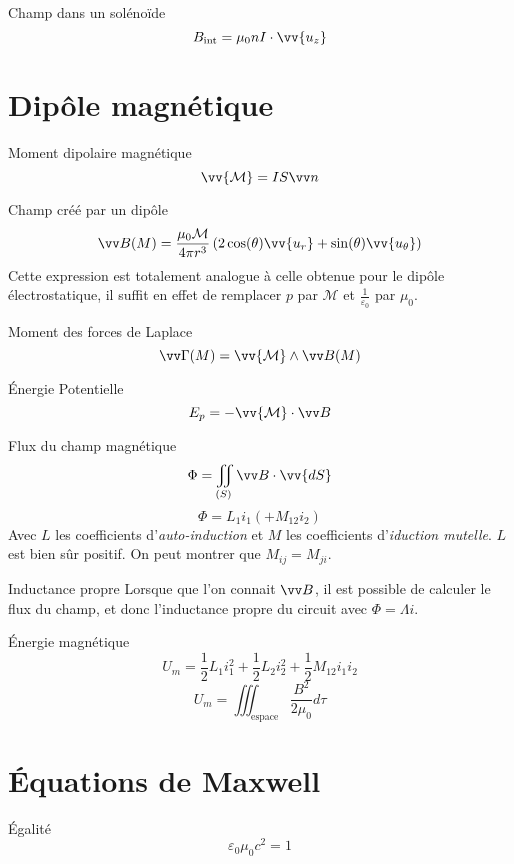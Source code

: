 \documentclass[french, a4paper, 11pt, twocolumn]{article}
\newcommand{\inv}[1]{\dfrac{1}{#1}}
\newcommand{\po}{\left(}         %
\newcommand{\pf}{\right)}        %
\newcommand{\pof}[1]{\po #1 \pf} %
\newcommand{\vect}[1]{\vv{#1}}
\newcommand{\uz}{\vect{u_z}}          %
\newcommand{\ur}{\vect{u_r}}          %
\newcommand{\uth}{\vect{u_\theta}}    %
\begin{document}
\begin{cadre}{Champ dans un solénoïde}
  \[B_{\text{int}}=\mu_{0}nI\cdot\uz\]
\end{cadre}

\section{Dipôle magnétique}
\begin{cadre}{Moment dipolaire magnétique}
  \[\vv{\mathcal M} = IS\vv n\]
\end{cadre}

\begin{cadre}{Champ créé par un dipôle}
  \[\vv B(M) = \dfrac{\mu_0\mathcal M}{4\pi r^3}\pof{2\cos(\theta)\ur + \sin(\theta)\uth}\]
  Cette expression est totalement analogue à celle obtenue pour le dipôle électrostatique, il suffit en effet de remplacer \(p\) par \(\mathcal M\) et \(\frac{1}{\varepsilon_{0}}\) par \(\mu_{0}\).
\end{cadre}

\begin{cadre}{Moment des forces de Laplace}
\[\vv\Gamma(M) = \vv{\mathcal M}\wedge \vv B(M)\]
\end{cadre}

\begin{cadre}{Énergie Potentielle}
  \[E_{p} = -\vv{\mathcal M}\cdot \vv B\]
\end{cadre}

\begin{cadre}{Flux du champ magnétique}
  \[\Phi = \iint_{(S)}\vv B\cdot\vv{dS}\]
  \[\Phi = L_{1}i_{1} (+ M_{12} i_{2})\]
  Avec \(L\) les coefficients d'\emph{auto-induction} et \(M\) les coefficients d'\emph{iduction mutelle}.
  \(L\) est bien sûr positif.
  On peut montrer que \(M_{ij} = M_{ji}\).
\end{cadre}

\begin{cadre}{Inductance propre}
  Lorsque que l'on connait \(\vv B\), il est possible de calculer le flux du champ, et donc l'inductance propre du circuit avec \(\Phi =\Lambda i\).
\end{cadre}

\begin{cadre}{Énergie magnétique}
  \[U_{m} = \inv{2}L_{1}i_{1}^{2}+\inv{2}L_{2}i_{2}^{2}+\inv{2}M_{12}i_{1}i_{2}\]
  \[U_{m} = \iiint_{\text{espace}}\dfrac{B^{2}}{2\mu_{0}}d\tau\]
\end{cadre}

\section{Équations de Maxwell}
\begin{cadre}{Égalité}
  \[\varepsilon_{0}\mu_{0}c^{2}=1\]
\end{cadre}
\end{document}
